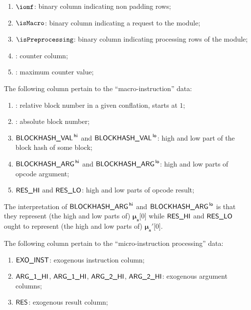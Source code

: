 \begin{enumerate}
	\item $\iomf$:
		binary column indicating non padding rows;
	\item $\isMacro$:
		binary column indicating a request to the \blockHashMod{} module;
	\item $\isPreprocessing$:
		binary column indicating processing rows of the \blockHashMod{} module;
	\item \ct:
		counter column;
	\item \ctMax:
		maximum counter value;
\end{enumerate}
The following column pertain to the ``macro-instruction'' data:
\begin{enumerate}[resume]
	\item \relBlock{}: 
		relative block number in a given conflation, starts at $1$;
	\item \absBlock{}:
		absolute block number;
	\item $\textsf{BLOCKHASH\_VAL}^{\mathsf{\,hi}}$ and $\textsf{BLOCKHASH\_VAL}^{\mathsf{\,lo}}$: 
		high and low part of the block hash of some block;
	\item $\textsf{BLOCKHASH\_ARG}^{\mathsf{\,hi}}$ and $\textsf{BLOCKHASH\_ARG}^{\mathsf{\,lo}}$: 
		high and low parts of  opcode argument;
	\item $\textsf{RES}\textsf{\_HI}$ and $\textsf{RES}\textsf{\_LO}$:
		high and low parts of  opcode result;
\end{enumerate}
\saNote{}
The interpretation of $\textsf{BLOCKHASH\_ARG}^{\mathsf{\,hi}}$ and $\textsf{BLOCKHASH\_ARG}^{\mathsf{\,lo}}$ is that they represent
(the high and low parts of) $\bm{\mu}_\textbf{s}\big[0\big]$
while $\textsf{RES}\textsf{\_HI}$ and $\textsf{RES}\textsf{\_LO}$ ought to represent
(the high and low parts of) $\bm{\mu}_\textbf{s}'\big[0\big]$.

\noindent The following column pertain to the ``micro-instruction processing'' data:
\begin{enumerate}[resume]
	\item $\textsf{EXO\_}\textsf{INST}$:
		exogenous instruction column;
	\item $\textsf{ARG}\textsf{\_1}\textsf{\_HI}$, $\textsf{ARG}\textsf{\_1}\textsf{\_HI}$, $\textsf{ARG}\textsf{\_2}\textsf{\_HI}$, $\textsf{ARG}\textsf{\_2}\textsf{\_HI}$:
		exogenous argument columns;
	\item $\textsf{RES}$:
		exogenous result column;
\end{enumerate}
